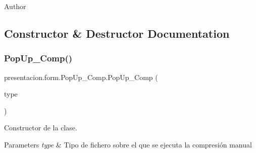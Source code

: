 \begin{DoxyAuthor}{Author}

\end{DoxyAuthor}


\subsection{Constructor \& Destructor Documentation}
\mbox{\label{classpresentacion_1_1form_1_1PopUp__Comp_afe8952b1a34b6ed17ad1698000ceba81}} 
\subsubsection{\texorpdfstring{Pop\+Up\+\_\+\+Comp()}{PopUp\_Comp()}}
{\footnotesize\ttfamily presentacion.\+form.\+Pop\+Up\+\_\+\+Comp.\+Pop\+Up\+\_\+\+Comp (\begin{DoxyParamCaption}\item[{global.\+type}]{type }\end{DoxyParamCaption})\hspace{0.3cm}{\ttfamily [inline]}}



Constructor de la clase. 


\begin{DoxyParams}{Parameters}
{\em type} & Tipo de fichero sobre el que se ejecuta la compresión manual \\
\hline
\end{DoxyParams}


